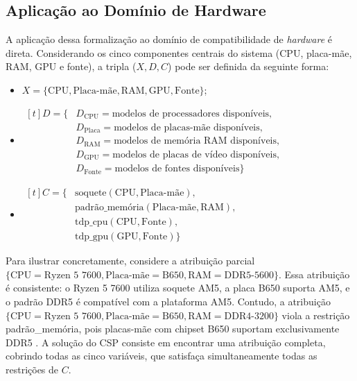 \subsection{Aplicação ao Domínio de Hardware}
A aplicação dessa formalização ao domínio de compatibilidade de \textit{hardware} é
direta. Considerando os cinco componentes centrais do sistema (CPU, placa-mãe, RAM, GPU e fonte), a tripla ($X, D, C$) pode ser definida da seguinte forma:
\begin{itemize}
  \item $X = \{\text{CPU}, \text{Placa-mãe}, \text{RAM}, \text{GPU}, \text{Fonte}\}$;

  \item $\begin{aligned}[t]
            D = \{ & D_{\text{CPU}} = \text{modelos de processadores disponíveis},   \\
                   & D_{\text{Placa}} = \text{modelos de placas-mãe disponíveis},    \\
                   & D_{\text{RAM}} = \text{modelos de memória RAM disponíveis},     \\
                   & D_{\text{GPU}} = \text{modelos de placas de vídeo disponíveis}, \\
                   & D_{\text{Fonte}} = \text{modelos de fontes disponíveis} \}
          \end{aligned}$

  \item $\begin{aligned}[t]
            C = \{ & \text{soquete}(\text{CPU}, \text{Placa-mãe}),         \\
                   & \text{padrão\_memória}(\text{Placa-mãe}, \text{RAM}), \\
                   & \text{tdp\_cpu}(\text{CPU}, \text{Fonte}),            \\
                   & \text{tdp\_gpu}(\text{GPU}, \text{Fonte}) \}
          \end{aligned}$
\end{itemize}

Para ilustrar concretamente, considere a atribuição parcial
$\{\text{CPU} = \text{Ryzen 5 7600}, \allowbreak \text{Placa-mãe} = \text{B650}, \allowbreak \text{RAM} = \text{DDR5-5600}\}$.
Essa atribuição é consistente: o Ryzen 5 7600 utiliza soquete AM5, a placa B650 suporta AM5,
e o padrão DDR5 é compatível com a plataforma AM5. Contudo, a atribuição
$\{\text{CPU} = \text{Ryzen 5 7600}, \allowbreak \text{Placa-mãe} = \text{B650}, \allowbreak \text{RAM} = \text{DDR4-3200}\}$
viola a restrição padrão\_memória, pois placas-mãe com chipset B650 suportam exclusivamente DDR5 \cite{AMD2022,JEDEC2020}.
A solução do CSP consiste em encontrar uma atribuição completa, cobrindo todas as cinco variáveis,
que satisfaça simultaneamente todas as restrições de $C$.

